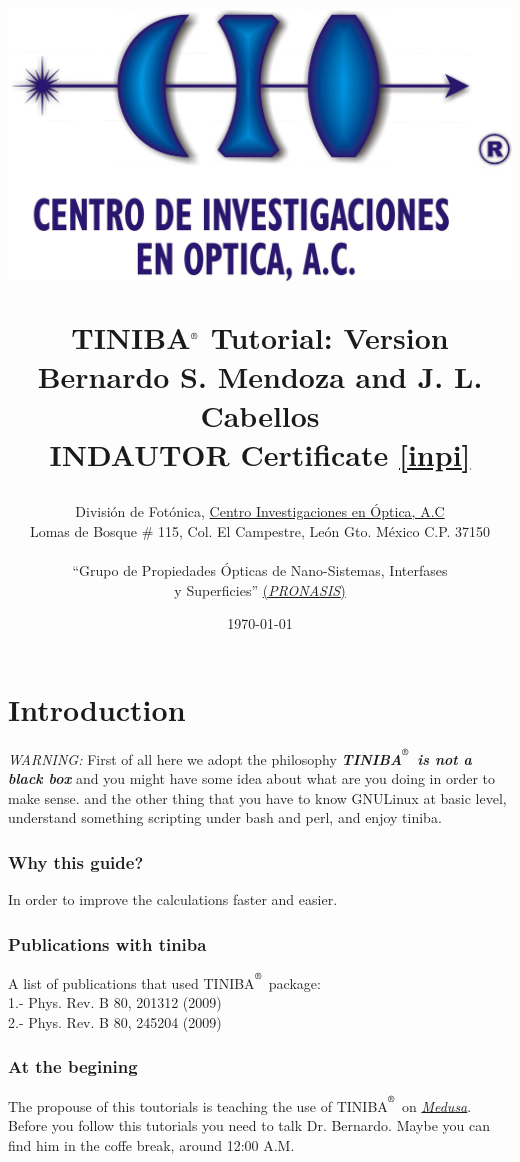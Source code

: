 \documentclass[openany,oneside]{book}
\title{
\vspace{-50pt}
\begin{center}
\includegraphics[scale=0.5]{logo-cio-nuevo.jpg}  
\vspace{10pt}
\end{center}
\vspace{12pt}
\Large{\textbf{TINIBA$^{\reg}$ Tutorial: Version \ver} \\
 Bernardo S. Mendoza and J. L. Cabellos}\\
INDAUTOR Certificate \ref{inpi} 
}
\author{{Divisi\'on de Fot\'onica, \href{http://www.cio.mx}{Centro
      Investigaciones en \'Optica, A.C }}\\
\small{Lomas de Bosque \# 115, Col. El Campestre, Le\'on Gto. M\'exico C.P. 37150}\\ 
\date{\today }
``Grupo de Propiedades \'Opticas de Nano-Sistemas, Interfases\\ y 
Superficies''
\href{http://aida.cio.mx}{(\emph{PRONASIS})} \\   
}
\def\reg{\textsuperscript{\textregistered}}
\numberwithin{equation}{section}
\begin{document}
\maketitle
\tableofcontents


\newpage
\chapter{Introduction}

\emph{WARNING:}
First of all here we adopt the philosophy \emph{{\bf{TINIBA$^\reg$ is
      not a black box}}} 
and you might have some idea about what are you doing in order to make sense.
and the other thing that you have to know GNU\/Linux at basic level, 
understand something  scripting under bash and perl, 
and enjoy tiniba.   
  
\subsection{Why this guide?}
In order to improve the calculations faster and easier. 

\subsection{Publications with tiniba}
 A list of publications that used TINIBA$^\reg$ package:\\
 1.- Phys. Rev. B 80, 201312 (2009) \\  
 2.- Phys. Rev. B 80, 245204 (2009) \\ 

\subsection{At the begining}
The propouse of this toutorials is teaching the use of TINIBA$^\reg$ 
on \href{http://aida.cio.mx/medusaPhotos/medusaPhoto2.jpg} {\emph{Medusa}}.\\ 
Before you follow this tutorials you need to talk  Dr. Bernardo.  
Maybe you can find him in the coffe break, around 12:00 A.M.
\end{document}
